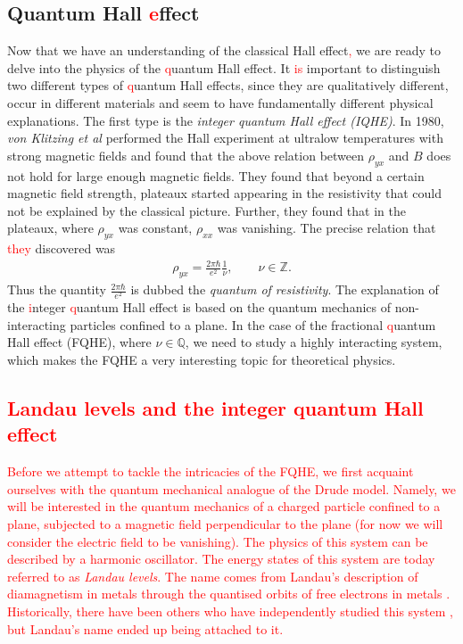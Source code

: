         \subsection{Quantum Hall \textcolor{red}{e}ffect}
        Now that we have an understanding of the classical Hall effect\textcolor{red}{,} we are ready to delve into the physics of the \textcolor{red}{q}uantum Hall effect. It \textcolor{red}{is} important to distinguish two different types of \textcolor{red}{q}uantum Hall effects, since they are qualitatively different, occur in different materials and seem to have fundamentally different physical explanations.
        The first type is the \textit{integer quantum Hall effect (IQHE)}. In 1980, \colorbox{red}{ } \textit{von Klitzing et al} \cite{vonKlitzing:1980pdk} performed the Hall experiment at ultralow temperatures with strong magnetic fields and found that the above relation between $\rho_{yx}$ and $B$ does not hold for large enough magnetic fields. They found that beyond a certain magnetic field strength, plateaux started appearing in the resistivity that could not be explained by the classical picture. Further, they found that in the plateaux, where $\rho_{yx}$ was constant, $\rho_{xx}$ was vanishing. The precise relation that \textcolor{red}{they} discovered was
        \begin{align}
            \rho_{yx} = \frac{2 \pi \hbar}{e^2} \frac{1}{\nu}, \qquad \nu \in \mathbb{Z}.
        \end{align}
        Thus the quantity $\frac{2 \pi \hbar}{e^2}$ is dubbed the \textit{quantum of resistivity}. The explanation of the \textcolor{red}{i}nteger \textcolor{red}{q}uantum Hall effect is based on the quantum mechanics of non-interacting particles confined to a plane. In the case of the fractional \textcolor{red}{q}uantum Hall effect (FQHE), where $\nu \in \mathbb{Q}$, we need to study a highly interacting system, which makes the FQHE a very interesting topic for theoretical physics.

 \textcolor{red}{\subsection{Landau levels and the integer quantum Hall effect}}

\textcolor{red}{Before we attempt to tackle the intricacies of the FQHE, we first acquaint ourselves with the quantum mechanical analogue of the Drude model. Namely, we will be interested in the quantum mechanics of a charged particle confined to a plane, subjected to a magnetic field perpendicular to the plane (for now we will consider the electric field to be vanishing). The physics of this system can be described by a harmonic oscillator. The energy states of this system are today referred to as \textit{Landau levels}. The name comes from Landau's description of diamagnetism in metals through the quanti\textcolor{red}{s}ed orbits of free electrons in metals \cite{Landau1930}. Historically, there have been others who have independently studied this system \cite{Rabi1928, Fock1928, FrenkelBronshtein1930}, but Landau's name ended up being attached to it.}

